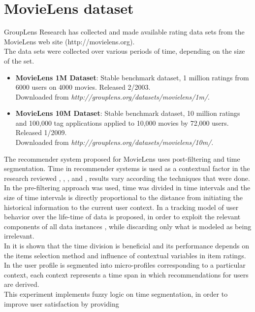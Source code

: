 \section{MovieLens dataset} 

GroupLens Research has collected and made available rating data sets
from the MovieLens  web site (http://movielens.org). \\   The data sets
were collected over various periods of time,  depending on the size of
the set.
\begin{itemize} 
\item \textbf{MovieLens 1M Dataset}: Stable
benchmark dataset, 1 million ratings from 6000 users on 4000 movies.
Released 2/2003.\\ Downloaded from
\textit{http://grouplens.org/datasets/movielens/1m/}. 
\item \textbf{MovieLens
10M Dataset}: Stable benchmark dataset, 10 million ratings and 100,000
tag applications applied to 10,000 movies by 72,000 users. Released
1/2009. \\Downloaded from
\textit{http://grouplens.org/datasets/movielens/10m/}. 
\end{itemize}
The recommender system proposed for MovieLens uses post-filtering 
and time segmentation.
Time in recommender systems is used  as a contextual factor in the
research reviewed \cite{baltrunas2009context},
\cite{baltrunas2009towards}, \cite{koren2010collaborative}, and
\cite{he2009time}, results vary according the techniques that were
done.\\  In \cite{he2009time} the pre-filtering approach was used, time
was divided in time intervals and the size of time intervals is
directly proportional to the distance from initiating the historical
information to the current user context. In
\cite{koren2010collaborative} a tracking model of user behavior over
the life-time of data is proposed, in order to exploit the relevant
components of all  data instances , while discarding only what is
modeled as being irrelevant.\\  In \cite{baltrunas2009context} it is
shown that the time division is beneficial and its performance depends
on the items selection method and influence of contextual variables in
item ratings. In \cite{baltrunas2009towards} the user profile is
segmented into micro-profiles corresponding to a particular context,
each context represents a time span in which recommendations for users
are derived.\\  This experiment implements fuzzy logic on time
segmentation, in order to improve user satisfaction by providing
